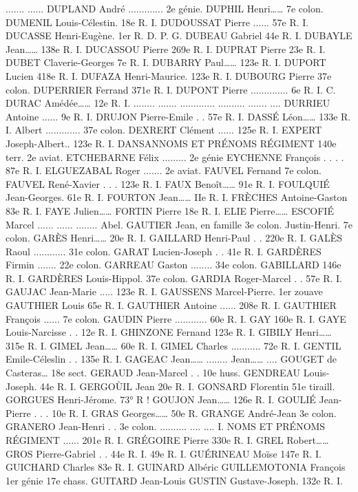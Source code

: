 \documentclass[a4paper,11pt]{book}
\begin{document}
.......
......
DUPLAND André ............. 2e génie.
DUPHIL Henri……
7e colon.
DUMENIL Louis-Célestin. 18e R. I.
DUDOUSSAT Pierre ...... 57e R. I.
DUCASSE Henri-Eugène. 1er R. D. P. G.
DUBEAU Gabriel
44e R. I.
DUBAYLE Jean……
138e R. I.
DUCASSOU Pierre
269e R. I.
DUPRAT Pierre
23e R. I.
DUBET Claverie-Georges 7e R. I.
DUBARRY Paul……
123e R. I.
DUPORT Lucien
418e R. I.
DUFAZA Henri-Maurice. 123e R. I.
DUBOURG Pierre
37e colon.
DUPERRIER Ferrand
371e R. I.
DUPONT Pierre .............. 6e R. I. C.
DURAC Amédée……
12e R. I.
........
.......
.............
..........
.......
....
DURRIEU Antoine
...... 9e R. I.
DRUJON Pierre-Emile . . 57e R. I.
DASSÉ Léon……
133e R. I.
Albert ............. 37e colon.
DEXRERT Clément ......
125e R. I.
EXPERT Joseph-Albert.. 123e R. I.
DANSANNOMS ET PRÉNOMS
RÉGIMENT
140e terr.
2e aviat.
ETCHEBARNE Félix ......... 2e génie
EYCHENNE François . . . . 87e R. I.
ELGUEZABAL Roger ....... 2e aviat.
FAUVEL Fernand
7e colon.
FAUVEL René-Xavier . . . 123e R. I.
FAUX Benoît……
91e R. I.
FOULQUIÉ Jean-Georges. 61e R. I.
FOURTON Jean……
IIe R. I.
FRÈCHES Antoine-Gaston 83e R. I.
FAYE Julien……
FORTIN Pierre
18e R. I.
ELIE Pierre……
ESCOFIÉ Marcel
......
......
........
Abel.
GAUTIER Jean, en famille
3e colon.
Justin-Henri. 7e colon.
GARÈS Henri……
20e R. I.
GAILLARD Henri-Paul . . 220e R. I.
GALÈS Raoul ............ 31e colon.
GARAT Lucien-Joseph . . 41e R. I.
GARDÈRES Firmin ....... 22e colon.
GARREAU Gaston ........
34e colon.
GABILLARD
146e R. I.
GARDÈRES Louis-Hippol. 37e colon.
GARDIA Roger-Marcel . . 57e R. I.
GAUJAC Jean-Marie ..... 123e R. I.
GAUSSENS Marcel-Pierre. 1er zouave
GAUTHIER Louis
65e R. I.
GAUTHIER Antoine ...... 208e R. I.
GAUTHIER François ...... 7e colon.
GAUDIN Pierre ............ 60e R. I.
GAY
160e R. I.
GAYE Louis-Narcisse . . 12e R. I.
GHINZONE Fernand
123e R. I.
GIBILY Henri……
315e R. I.
GIMEL Jean……
60e R. I.
GIMEL Charles ........... 72e R. I.
GENTIL Emile-Céleslin . . 135e R. I.
GAGEAC Jean……
........
Jean……
....
GOUGET de Casteras… 18e sect.
GERAUD Jean-Marcel . . 10e huss.
GENDREAU Louis-Joseph. 44e R. I.
GERGOÙIL Jean
20e R. I.
GONSARD Florentin
51e tiraill.
GORGUES Henri-Jérome. 73° R !
GOUJON Jean……
126e R. I.
GOULIÉ Jean-Pierre . . . 10e R. I.
GRAS Georges……
50e R.
GRANGE André-Jean
3e colon.
GRANERO Jean-Henri . . 3e colon.
..........
....
....
I.
NOMS ET PRÉNOMS
RÉGIMENT
......
201e R. I.
GRÉGOIRE Pierre
330e R. I.
GREL Robert……
GROS Pierre-Gabriel . . 44e R. I.
49e R. I.
GUÉRINEAU Moïse
147e R. I.
GUICHARD Charles
83e R. I.
GUINARD Albéric
GUILLEMOTONIA François 1er génie
17e chass.
GUITARD Jean-Louis
GUSTIN Gustave-Joseph. 132e R. I.
\end{document}
